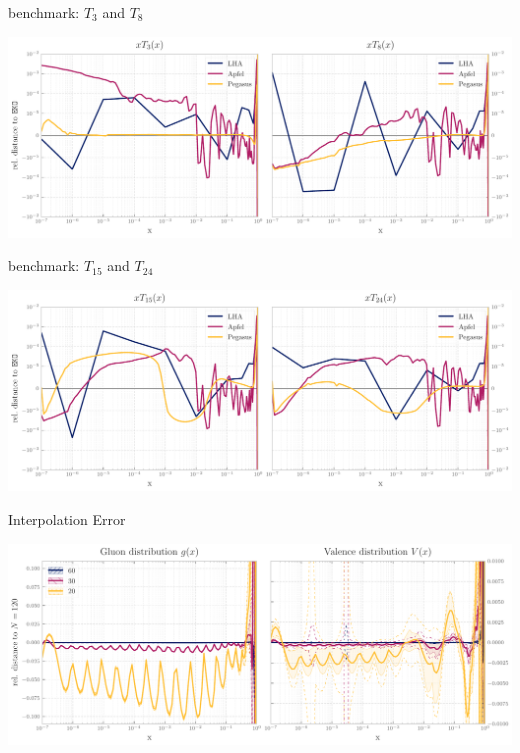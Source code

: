 \documentclass[9pt]{beamer}
\begin{document}
\begin{frame}{\eko{} \lha{} benchmark: $T_3$ and $T_8$}
	\begin{center}
		\includegraphics[width=\linewidth]{lha_bench_T3_T8.pdf}
	\end{center}
\end{frame}
\begin{frame}{\eko{} \lha{} benchmark: $T_{15}$ and $T_{24}$}
	\begin{center}
		\includegraphics[width=\linewidth]{lha_bench_T15_T24.pdf}
	\end{center}
\end{frame}
\begin{frame}{\eko{} Interpolation Error}
	\begin{center}
		\includegraphics[width=\linewidth]{interpolation-int-ratio.pdf}
	\end{center}
\end{frame}
\end{document}
